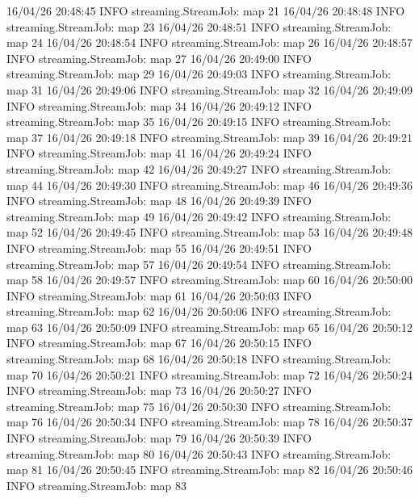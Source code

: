 16/04/26 20:48:45 INFO streaming.StreamJob:  map 21%
16/04/26 20:48:48 INFO streaming.StreamJob:  map 23%
16/04/26 20:48:51 INFO streaming.StreamJob:  map 24%
16/04/26 20:48:54 INFO streaming.StreamJob:  map 26%
16/04/26 20:48:57 INFO streaming.StreamJob:  map 27%
16/04/26 20:49:00 INFO streaming.StreamJob:  map 29%
16/04/26 20:49:03 INFO streaming.StreamJob:  map 31%
16/04/26 20:49:06 INFO streaming.StreamJob:  map 32%
16/04/26 20:49:09 INFO streaming.StreamJob:  map 34%
16/04/26 20:49:12 INFO streaming.StreamJob:  map 35%
16/04/26 20:49:15 INFO streaming.StreamJob:  map 37%
16/04/26 20:49:18 INFO streaming.StreamJob:  map 39%
16/04/26 20:49:21 INFO streaming.StreamJob:  map 41%
16/04/26 20:49:24 INFO streaming.StreamJob:  map 42%
16/04/26 20:49:27 INFO streaming.StreamJob:  map 44%
16/04/26 20:49:30 INFO streaming.StreamJob:  map 46%
16/04/26 20:49:36 INFO streaming.StreamJob:  map 48%
16/04/26 20:49:39 INFO streaming.StreamJob:  map 49%
16/04/26 20:49:42 INFO streaming.StreamJob:  map 52%
16/04/26 20:49:45 INFO streaming.StreamJob:  map 53%
16/04/26 20:49:48 INFO streaming.StreamJob:  map 55%
16/04/26 20:49:51 INFO streaming.StreamJob:  map 57%
16/04/26 20:49:54 INFO streaming.StreamJob:  map 58%
16/04/26 20:49:57 INFO streaming.StreamJob:  map 60%
16/04/26 20:50:00 INFO streaming.StreamJob:  map 61%
16/04/26 20:50:03 INFO streaming.StreamJob:  map 62%
16/04/26 20:50:06 INFO streaming.StreamJob:  map 63%
16/04/26 20:50:09 INFO streaming.StreamJob:  map 65%
16/04/26 20:50:12 INFO streaming.StreamJob:  map 67%
16/04/26 20:50:15 INFO streaming.StreamJob:  map 68%
16/04/26 20:50:18 INFO streaming.StreamJob:  map 70%
16/04/26 20:50:21 INFO streaming.StreamJob:  map 72%
16/04/26 20:50:24 INFO streaming.StreamJob:  map 73%
16/04/26 20:50:27 INFO streaming.StreamJob:  map 75%
16/04/26 20:50:30 INFO streaming.StreamJob:  map 76%
16/04/26 20:50:34 INFO streaming.StreamJob:  map 78%
16/04/26 20:50:37 INFO streaming.StreamJob:  map 79%
16/04/26 20:50:39 INFO streaming.StreamJob:  map 80%
16/04/26 20:50:43 INFO streaming.StreamJob:  map 81%
16/04/26 20:50:45 INFO streaming.StreamJob:  map 82%
16/04/26 20:50:46 INFO streaming.StreamJob:  map 83%
